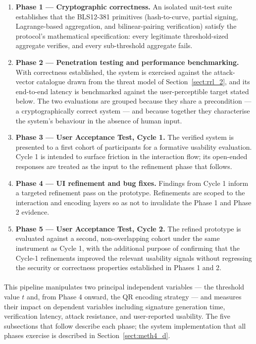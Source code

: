\documentclass[a4paper]{scl-article}
\begin{document}
\begin{enumerate}
    \item \textbf{Phase 1 --- Cryptographic correctness.} An isolated unit-test suite establishes that the BLS12-381 primitives (hash-to-curve, partial signing, Lagrange-based aggregation, and bilinear-pairing verification) satisfy the protocol's mathematical specification: every legitimate threshold-sized aggregate verifies, and every sub-threshold aggregate fails.
    \item \textbf{Phase 2 --- Penetration testing and performance benchmarking.} With correctness established, the system is exercised against the attack-vector catalogue drawn from the threat model of Section~\ref{sect:rrl_2}, and its end-to-end latency is benchmarked against the user-perceptible target stated below. The two evaluations are grouped because they share a precondition --- a cryptographically correct system --- and because together they characterise the system's behaviour in the absence of human input.
    \item \textbf{Phase 3 --- User Acceptance Test, Cycle 1.} The verified system is presented to a first cohort of participants for a formative usability evaluation. Cycle 1 is intended to surface friction in the interaction flow; its open-ended responses are treated as the input to the refinement phase that follows.
    \item \textbf{Phase 4 --- UI refinement and bug fixes.} Findings from Cycle 1 inform a targeted refinement pass on the prototype. Refinements are scoped to the interaction and encoding layers so as not to invalidate the Phase 1 and Phase 2 evidence.
    \item \textbf{Phase 5 --- User Acceptance Test, Cycle 2.} The refined prototype is evaluated against a second, non-overlapping cohort under the same instrument as Cycle 1, with the additional purpose of confirming that the Cycle-1 refinements improved the relevant usability signals without regressing the security or correctness properties established in Phases 1 and 2.
\end{enumerate}

\paragraph{}This pipeline manipulates two principal independent variables --- the threshold value $t$ and, from Phase 4 onward, the QR encoding strategy --- and measures their impact on dependent variables including signature generation time, verification latency, attack resistance, and user-reported usability. The five subsections that follow describe each phase; the system implementation that all phases exercise is described in Section~\ref{sect:meth4_d}.
\end{document}
